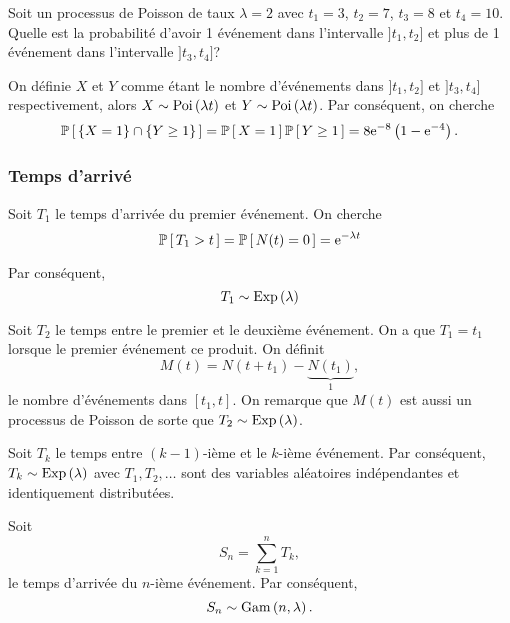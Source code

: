 \documentclass[11pt]{article}
\renewcommand\P[1]{%
	\ensuremath{%
		\mathbb{P}\left[\,#1\,\right]%
	}%
}%
\newcommand\e{%
	\ensuremath{%
		\mathrm{e}%
	}%
}%
\newcommand\Poi[1]{%
	\ensuremath{%
		\mathrm{Poi}\left(#1\right)%
	}%
}%
\newcommand\Exp[1]{%
	\ensuremath{%
		\mathrm{Exp}\left(#1\right)%
	}%
}%
\newcommand\Gam[2]{%
	\ensuremath{%
		\mathrm{Gam}\left(#1,#2\right)%
	}%
}%
\begin{document}
\begin{exemple}
	Soit un processus de Poisson de taux $\lambda=2$ avec $t_1=3$, $t_2=7$,
	$t_3=8$ et $t_4=10$. Quelle est la probabilité d'avoir 1 événement dans
	l'intervalle $]t_1,t_2]$ et plus de 1 événement dans l'intervalle
	$]t_3,t_4]$?
	
	On définie $X$ et $Y$ comme étant le nombre d'événements dans $]t_1,t_2]$
	et $]t_3,t_4]$ respectivement, alors $X\sim\Poi{\lambda t}$ et
	$Y\sim\Poi{\lambda t}$. Par conséquent, on cherche
	\begin{equation*}
		\P{\left\{X=1\right\}\cap\left\{Y\geq 1\right\}}
		=\P{X=1}\P{Y\geq 1}
		=8\e^{-8}\left(1-\e^{-4}\right).
	\end{equation*}
\end{exemple}

\subsubsection{Temps d'arrivé}
Soit $T_1$ le temps d'arrivée du premier événement. On cherche
\begin{equation*}
	\P{T_1>t}
	=\P{N(t)=0}
	=\e^{-\lambda t}
\end{equation*}
%

Par conséquent,
\begin{equation*}
	T_1\sim\Exp{\lambda}
\end{equation*}

Soit $T_2$ le temps entre le premier et le deuxième événement. On a que 
$T_1=t_1$ lorsque le premier événement ce produit. On définit
\begin{equation*}
	M(t)=N(t+t_1)-\underbrace{N(t_1)}_{1},
\end{equation*}
le nombre d'événements dans $[t_1,t]$. On remarque que $M(t)$ est aussi un
processus de Poisson de sorte que $T_2\sim\Exp{\lambda}$.

Soit $T_k$ le temps entre $(k-1)$-ième et le $k$-ième événement. Par
conséquent, $T_k\sim\Exp{\lambda}$ avec $T_1,T_2,\dots$ sont des variables
aléatoires indépendantes et identiquement distributées.

Soit
\begin{equation*}
	S_n=\sum_{k=1}^nT_k,
\end{equation*}
le temps d'arrivée du $n$-ième événement. Par conséquent,
\begin{equation*}
	S_n\sim\Gam{n}{\lambda}.
\end{equation*}
\end{document}
